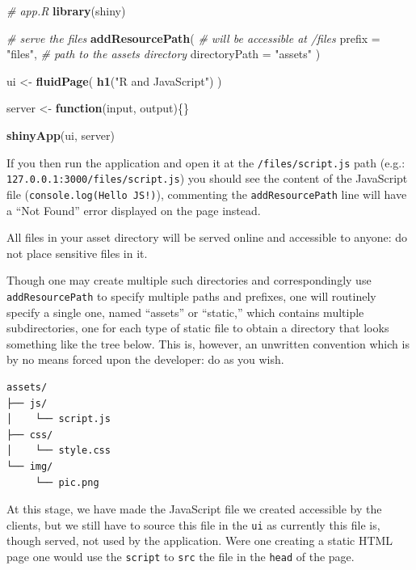 \documentclass[
  10pt,
]{krantz}
\makeatletter
\newenvironment{Shaded}{\begin{snugshade}}{\end{snugshade}}
\newcommand{\CommentTok}[1]{\textcolor[rgb]{0.37,0.37,0.37}{\textit{#1}}}
\newcommand{\ControlFlowTok}[1]{\textcolor[rgb]{0.27,0.27,0.27}{\textbf{#1}}}
\newcommand{\DataTypeTok}[1]{\textcolor[rgb]{0.27,0.27,0.27}{#1}}
\newcommand{\KeywordTok}[1]{\textcolor[rgb]{0.27,0.27,0.27}{\textbf{#1}}}
\newcommand{\NormalTok}[1]{#1}
\newcommand{\StringTok}[1]{\textcolor[rgb]{0.5,0.5,0.5}{#1}}
\newenvironment{kframe}{%
\medskip{}
\setlength{\fboxsep}{.8em}
 \def\at@end@of@kframe{}%
 \ifinner\ifhmode%
  \def\at@end@of@kframe{\end{minipage}}%
  \begin{minipage}{\columnwidth}%
 \fi\fi%
 \def\FrameCommand##1{\hskip\@totalleftmargin \hskip-\fboxsep
 \colorbox{shadecolor}{##1}\hskip-\fboxsep
     \hskip-\linewidth \hskip-\@totalleftmargin \hskip\columnwidth}%
 \MakeFramed {\advance\hsize-\width
   \@totalleftmargin\z@ \linewidth\hsize
   \@setminipage}}%
 {\par\unskip\endMakeFramed%
 \at@end@of@kframe}
\renewenvironment{Shaded}{\begin{kframe}}{\end{kframe}}
\newenvironment{rmdblock}[1]
  {
  \begin{itemize}
  \renewcommand{\labelitemi}{
    \raisebox{-.7\height}[0pt][0pt]{
      {\setkeys{Gin}{width=3em,keepaspectratio}\texttt{[image: images/\#1]}}
    }
  }
  \setlength{\fboxsep}{1em}
  \begin{kframe}
  \item
  }
  {
  \end{kframe}
  \end{itemize}
  }
\newenvironment{rmdnote}
  {\begin{rmdblock}{note}}
  {\end{rmdblock}}
\makeatother
\begin{document}
\begin{Shaded}
\begin{Highlighting}[]
\CommentTok{\# app.R}
\KeywordTok{library}\NormalTok{(shiny)}

\CommentTok{\# serve the files}
\KeywordTok{addResourcePath}\NormalTok{(}
  \CommentTok{\# will be accessible at /files}
  \DataTypeTok{prefix =} \StringTok{"files"}\NormalTok{, }
  \CommentTok{\# path to the assets directory}
  \DataTypeTok{directoryPath =} \StringTok{"assets"}
\NormalTok{)}

\NormalTok{ui <{-}}\StringTok{ }\KeywordTok{fluidPage}\NormalTok{(}
  \KeywordTok{h1}\NormalTok{(}\StringTok{"R and JavaScript"}\NormalTok{)}
\NormalTok{)}

\NormalTok{server <{-}}\StringTok{ }\ControlFlowTok{function}\NormalTok{(input, output)\{\}}

\KeywordTok{shinyApp}\NormalTok{(ui, server)}
\end{Highlighting}
\end{Shaded}

If you then run the application and open it at the \texttt{/files/script.js} path (e.g.: \texttt{127.0.0.1:3000/files/script.js}) you should see the content of the JavaScript file (\texttt{console.log(\textquotesingle{}Hello\ JS!\textquotesingle{})}), commenting the \texttt{addResourcePath} line will have a ``Not Found'' error displayed on the page instead.

\begin{rmdnote}
All files in your asset directory will be served online and accessible
to anyone: do not place sensitive files in it.
\end{rmdnote}

Though one may create multiple such directories and correspondingly use \texttt{addResourcePath} to specify multiple paths and prefixes, one will routinely specify a single one, named ``assets'' or ``static,'' which contains multiple subdirectories, one for each type of static file to obtain a directory that looks something like the tree below. This is, however, an unwritten convention which is by no means forced upon the developer: do as you wish.

\begin{verbatim}
assets/
├── js/
│    └── script.js
├── css/
│    └── style.css
└── img/
     └── pic.png
\end{verbatim}

At this stage, we have made the JavaScript file we created accessible by the clients, but we still have to source this file in the \texttt{ui} as currently this file is, though served, not used by the application. Were one creating a static HTML page one would use the \texttt{script} to \texttt{src} the file in the \texttt{head} of the page.
\end{document}
